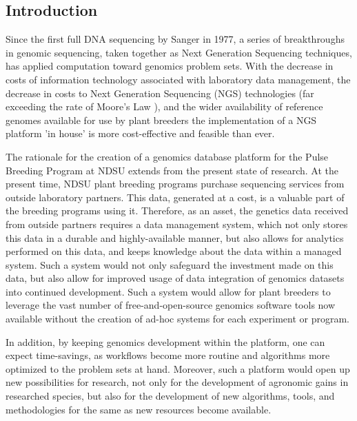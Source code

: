 \documentclass[12pt, letterpaper,oneocolumn]{article}
\begin{document}
	\subsection{Introduction}
	Since the first full DNA sequencing by Sanger in 1977, a series of breakthroughs in genomic sequencing, taken together as Next Generation Sequencing techniques, has applied computation toward genomics problem sets. With the decrease in costs of information technology associated with laboratory data management, the decrease in costs to Next Generation Sequencing (NGS) technologies (far exceeding the rate of Moore's Law \cite{GSPcost}), and the wider availability of reference genomes available for use by plant breeders \cite{ensembl} \cite{phytozome} the implementation of a NGS platform 'in house' is more cost-effective and feasible than ever.

	The rationale for the creation of a genomics database platform for the Pulse Breeding Program at NDSU extends from the present state of research. At the present time, NDSU plant breeding programs purchase sequencing services from outside laboratory partners. This data, generated at a cost, is a valuable part of the breeding programs using it. Therefore, as an asset, the genetics data received from outside partners requires a data management system, which not only stores this data in a durable and highly-available manner, but also allows for analytics performed on this data, and keeps knowledge about the data within a managed system. Such a system would not only safeguard the investment made on this data, but also allow for improved usage of data integration of genomics datasets into continued development. Such a system would allow for plant breeders to leverage the vast number of free-and-open-source genomics software tools now available without the creation of ad-hoc systems for each experiment or program.

	In addition, by keeping genomics development within the platform, one can expect time-savings, as workflows become more routine and algorithms more optimized to the problem sets at hand. Moreover, such a platform would open up new possibilities for research, not only for the development of agronomic gains in researched species, but also for the development of new algorithms, tools, and methodologies for the same as new resources become available.
\end{document}

